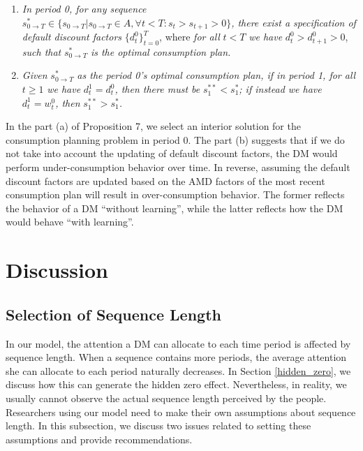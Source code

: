 \documentclass[
  12pt,
]{article}
\begin{document}
\begin{enumerate}
\def\labelenumi{(\alph{enumi})}
\item
  \emph{In period 0, for any sequence}
  \(s_{0\rightarrow T}^*\in \{s_{0\rightarrow T}|s_{0\rightarrow T}\in A,\forall t<T:s_t>s_{t+1}>0\}\)\emph{,
  there exist a specification of default discount factors}
  \(\{d_t^0\}_{t=0}^T\), where \emph{for all} \(t<T\) \emph{we have}
  \(d_t^0 >d_{t+1}^0>0\), \emph{such that} \(s_{0\rightarrow T}^*\)
  \emph{is the optimal consumption plan.}
\item
  \emph{Given} \(s_{0\rightarrow T}^*\) \emph{as the period 0's optimal
  consumption plan, if in period 1, for all} \(t\geq 1\) \emph{we have}
  \(d_t^1=d_t^0\)\emph{, then there must be} \(s_1^{**}< s_1^*\)\emph{;
  if instead we have} \(d_t^1=w_t^0\)\emph{, then}
  \(s_1^{**}> s_1^*\)\emph{.}
\end{enumerate}

In the part (a) of Proposition 7, we select an interior solution for the
consumption planning problem in period 0. The part (b) suggests that if
we do not take into account the updating of default discount factors,
the DM would perform under-consumption behavior over time. In reverse,
assuming the default discount factors are updated based on the AMD
factors of the most recent consumption plan will result in
over-consumption behavior. The former reflects the behavior of a DM
``without learning'', while the latter reflects how the DM would behave
``with learning''.

\hypertarget{discussion}{%
\section{\texorpdfstring{Discussion
\label{discuss}}{Discussion }}\label{discussion}}

\hypertarget{selection-of-sequence-length}{%
\subsection{\texorpdfstring{Selection of Sequence Length
\label{seq_length}}{Selection of Sequence Length }}\label{selection-of-sequence-length}}

In our model, the attention a DM can allocate to each time period is
affected by sequence length. When a sequence contains more periods, the
average attention she can allocate to each period naturally decreases.
In Section \ref{hidden_zero}, we discuss how this can generate the
hidden zero effect. Nevertheless, in reality, we usually cannot observe
the actual sequence length perceived by the people. Researchers using
our model need to make their own assumptions about sequence length. In
this subsection, we discuss two issues related to setting these
assumptions and provide recommendations.
\end{document}

